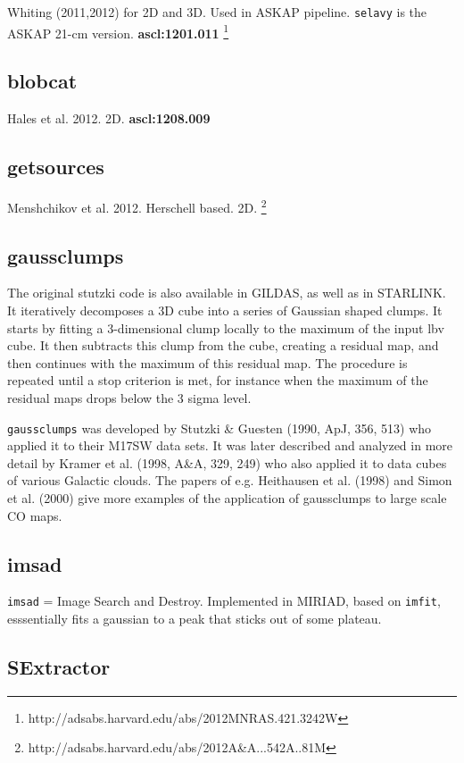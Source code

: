 \documentclass[preprint]{aastex} %
\begin{document}
Whiting (2011,2012) for 2D and 3D. Used in ASKAP pipeline. 
{\tt selavy} is the ASKAP 21-cm version. {\bf ascl:1201.011}
\footnote{http://adsabs.harvard.edu/abs/2012MNRAS.421.3242W}

\subsection{blobcat}

Hales et al. 2012.  2D.
{\bf ascl:1208.009}

\subsection{getsources}

Menshchikov et al. 2012. Herschell based. 2D.
\footnote{http://adsabs.harvard.edu/abs/2012A\&A...542A..81M}

\subsection{gaussclumps}

The original stutzki code is also available in GILDAS, as well as in
STARLINK.  It iteratively decomposes a 3D cube into a series of
Gaussian shaped clumps.  It starts by fitting a 3-dimensional clump
locally to the maximum of the input lbv cube. It then subtracts this
clump from the cube, creating a residual map, and then continues with
the maximum of this residual map.  The procedure is repeated until a
stop criterion is met, for instance when the maximum of the residual
maps drops below the 3 sigma level.

{\tt gaussclumps} was developed by Stutzki \& Guesten (1990, ApJ, 356, 513)
who applied it to their M17SW data sets. It was later described and
analyzed in more detail by Kramer et al. (1998, A\&A, 329, 249) who
also applied it to data cubes of various Galactic clouds.  The papers
of e.g. Heithausen et al. (1998) and Simon et al. (2000) give more examples
of the application of gaussclumps to large scale CO maps.

\subsection{imsad}

{\tt imsad} = Image Search and Destroy. 
Implemented in MIRIAD, based on {\tt imfit}, esssentially fits a gaussian
to a peak that sticks out of some plateau.

\subsection{SExtractor}
\end{document}
